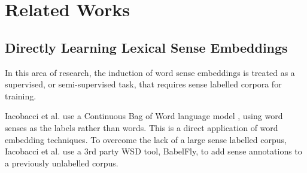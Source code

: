 \documentclass{article} %
\def\parencite{\cite} %
\providecommand{\DIFaddbegin}{} %
\providecommand{\DIFaddend}{} %
\providecommand{\DIFdelbegin}{} %
\providecommand{\DIFdelend}{} %
\begin{document}
\section{Related Works} \label{relatedwords}

\subsection{Directly Learning Lexical Sense Embeddings}
In this area of research, the induction of word sense embeddings is treated as a supervised, or semi-supervised task, that requires sense labelled corpora for training.

Iacobacci et al. \DIFdelbegin %
\DIFdelend \DIFaddbegin {} \DIFaddend use a Continuous Bag of Word language model \parencite{mikolov2013efficient}, using word senses as the labels rather than words. This is a direct application of word embedding techniques. To overcome the lack of a large sense labelled corpus, Iacobacci et al. use a 3rd party WSD tool, BabelFly, to add sense annotations to a previously unlabelled corpus.
\end{document}
